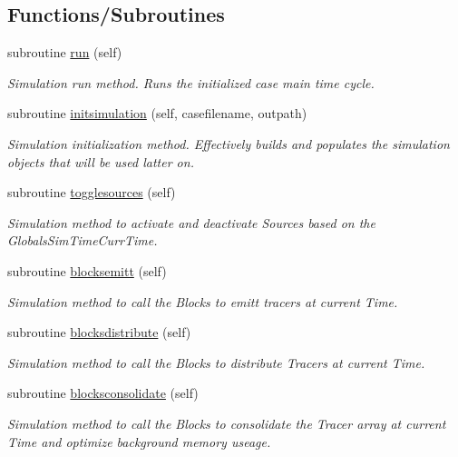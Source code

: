 \subsection*{Functions/\+Subroutines}
\begin{DoxyCompactItemize}
\item 
subroutine \mbox{\hyperlink{namespacesimulation__mod_a73bd78c4ac76c51f1e10f5847c25c4df}{run}} (self)
\begin{DoxyCompactList}\small\item\em Simulation run method. Runs the initialized case main time cycle. \end{DoxyCompactList}\item 
subroutine \mbox{\hyperlink{namespacesimulation__mod_aedbba2bb458cbcd7eb93938a5f7b5940}{initsimulation}} (self, casefilename, outpath)
\begin{DoxyCompactList}\small\item\em Simulation initialization method. Effectively builds and populates the simulation objects that will be used latter on. \end{DoxyCompactList}\item 
subroutine \mbox{\hyperlink{namespacesimulation__mod_a87a5141e4516b9610a6e4f0d2ff2d719}{togglesources}} (self)
\begin{DoxyCompactList}\small\item\em Simulation method to activate and deactivate Sources based on the GlobalsSim\+TimeCurr\+Time. \end{DoxyCompactList}\item 
subroutine \mbox{\hyperlink{namespacesimulation__mod_a13aa0745f4601e3f418143dab2f18276}{blocksemitt}} (self)
\begin{DoxyCompactList}\small\item\em Simulation method to call the Blocks to emitt tracers at current Time. \end{DoxyCompactList}\item 
subroutine \mbox{\hyperlink{namespacesimulation__mod_a058892630af07fc0fe8a4bffec531c6a}{blocksdistribute}} (self)
\begin{DoxyCompactList}\small\item\em Simulation method to call the Blocks to distribute Tracers at current Time. \end{DoxyCompactList}\item 
subroutine \mbox{\hyperlink{namespacesimulation__mod_a8390f0a56ff2678d144af1dd09517a5e}{blocksconsolidate}} (self)
\begin{DoxyCompactList}\small\item\em Simulation method to call the Blocks to consolidate the Tracer array at current Time and optimize background memory useage. \end{DoxyCompactList}\item 

\end{DoxyCompactItemize}
